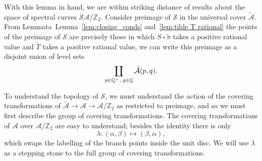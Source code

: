 \documentclass{article}
\begin{document}
With this lemma in hand, we are within striking distance of results about the space of spectral curves $\mathcal{S} \mathcal{A}/\mathbb{Z}_2$. Consider preimage of $\mathcal{S}$ in the universal cover $\mathcal{\tilde{A}}$. From Lemmata~Lemma~\ref{lem:closing_conds} and~\ref{lem:tilde T rational} the points of the preimage of $\mathcal{S}$ are precisely those in which $S\circ\tilde{\pi}$ takes a positive rational value and $\tilde{T}$ takes a positive rational value, we can write this preimage as a disjoint union of level sets
\[
\coprod_{p\in \mathbb{Q}^+,\; q\in \mathbb{Q}} \mathcal{\tilde{A}}(p,q).
\]


To understand the topology of $\mathcal{S}$, we must understand the action of the covering transformations of $\mathcal{\tilde{A}} \to \mathcal{A} \to \mathcal{A}/\mathbb{Z}_2$ as restricted to preimage, and so we must first describe the group of covering transformations. The covering transformations of $\mathcal{A}$ over $\mathcal{A}/\mathbb{Z}_2$ are easy to understand; besides the identity there is only
\[
\lambda : (\alpha,\beta) \mapsto (\beta,\alpha),
\]
which swaps the labelling of the branch points inside the unit disc. We will use $\lambda$ as a stepping stone to the full group of covering transformations.


\end{document}
